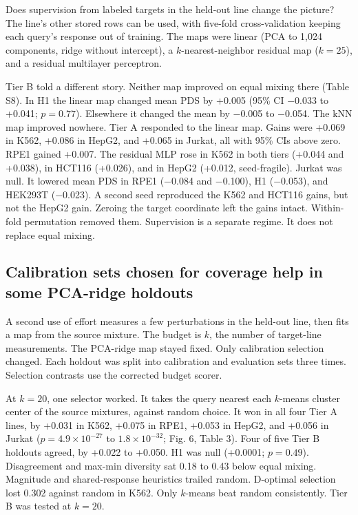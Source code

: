 \documentclass[12pt]{article}
\begin{document}
Does supervision from labeled targets in the held-out line change the picture? The line's other stored rows can be used, with five-fold cross-validation keeping each query's response out of training. The maps were linear (PCA to 1,024 components, ridge without intercept), a $k$-nearest-neighbor residual map ($k = 25$), and a residual multilayer perceptron.

Tier B told a different story. Neither map improved on equal mixing there (Table S8). In H1 the linear map changed mean PDS by +0.005 (95\% CI $-$0.033 to +0.041; $p = 0.77$). Elsewhere it changed the mean by $-$0.005 to $-$0.054. The kNN map improved nowhere. Tier A responded to the linear map. Gains were +0.069 in K562, +0.086 in HepG2, and +0.065 in Jurkat, all with 95\% CIs above zero. RPE1 gained +0.007. The residual MLP rose in K562 in both tiers (+0.044 and +0.038), in HCT116 (+0.026), and in HepG2 (+0.012, seed-fragile). Jurkat was null. It lowered mean PDS in RPE1 ($-$0.084 and $-$0.100), H1 ($-$0.053), and HEK293T ($-$0.023). A second seed reproduced the K562 and HCT116 gains, but not the HepG2 gain. Zeroing the target coordinate left the gains intact. Within-fold permutation removed them. Supervision is a separate regime. It does not replace equal mixing.

\subsection{Calibration sets chosen for coverage help in some PCA-ridge holdouts}

A second use of effort measures a few perturbations in the held-out line, then fits a map from the source mixture. The budget is $k$, the number of target-line measurements. The PCA-ridge map stayed fixed. Only calibration selection changed. Each holdout was split into calibration and evaluation sets three times. Selection contrasts use the corrected budget scorer.

At $k = 20$, one selector worked. It takes the query nearest each $k$-means cluster center of the source mixtures, against random choice. It won in all four Tier A lines, by +0.031 in K562, +0.075 in RPE1, +0.053 in HepG2, and +0.056 in Jurkat ($p = 4.9 \times 10^{-27}$ to $1.8 \times 10^{-32}$; Fig. 6, Table 3). Four of five Tier B holdouts agreed, by +0.022 to +0.050. H1 was null (+0.0001; $p = 0.49$). Disagreement and max-min diversity sat 0.18 to 0.43 below equal mixing. Magnitude and shared-response heuristics trailed random. D-optimal selection lost 0.302 against random in K562. Only $k$-means beat random consistently. Tier B was tested at $k = 20$.
\end{document}
